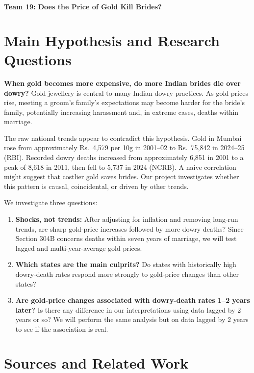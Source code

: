 \documentclass[12pt,a4paper]{article}
\begin{document}
\begin{center}
    {\Large\bfseries Team 19: Does the Price of Gold Kill Brides?}\\[3pt]
\end{center}

\section{Main Hypothesis and Research Questions}

\textbf{When gold becomes more expensive, do more Indian brides die
over dowry?} Gold jewellery is central to many Indian dowry practices.
As gold prices rise, meeting a groom's family's expectations may become
harder for the bride's family, potentially increasing harassment and,
in extreme cases, deaths within marriage.

The raw national trends appear to contradict this hypothesis. Gold in
Mumbai rose from approximately Rs.\ 4,579 per 10g in 2001--02 to
Rs.\ 75,842 in 2024--25 (RBI). Recorded dowry deaths increased from
approximately 6,851 in 2001 to a peak of 8,618 in 2011, then fell to
5,737 in 2024 (NCRB). A naive correlation might suggest that costlier
gold saves brides. Our project investigates whether this pattern is
causal, coincidental, or driven by other trends.

We investigate three questions:
\begin{enumerate}
    \item \textbf{Shocks, not trends:} After adjusting for inflation
    and removing long-run trends, are sharp gold-price increases
    followed by more dowry deaths? Since Section 304B concerns deaths
    within seven years of marriage, we will test lagged and
    multi-year-average gold prices.

    \item \textbf{Which states are the main culprits?} Do states with historically high
    dowry-death rates respond more strongly to gold-price changes
    than other states?

    \item \textbf{Are gold-price changes associated with dowry-death rates 1–2 years later?} 
    Is there any difference in our interpretations using data lagged by 2 years or so?
    We will perform the same analysis but on data lagged by 2 years to see if the association is real.
\end{enumerate}


\section{Sources and Related Work}
\end{document}
